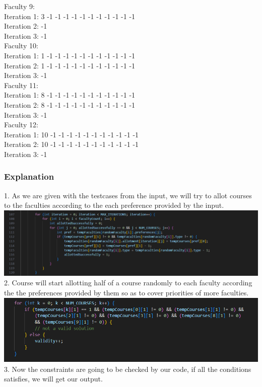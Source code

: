 \documentclass{article}
\begin{document}
Faculty 9: \\
Iteration 1: 3 -1 -1 -1 -1 -1 -1 -1 -1 -1 -1 -1\\ 
Iteration 2: -1\\
Iteration 3: -1\\
Faculty 10: \\
Iteration 1: 1 -1 -1 -1 -1 -1 -1 -1 -1 -1 -1 -1 \\
Iteration 2: 1 -1 -1 -1 -1 -1 -1 -1 -1 -1 -1 -1 \\
Iteration 3: -1\\
Faculty 11: \\
Iteration 1: 8 -1 -1 -1 -1 -1 -1 -1 -1 -1 -1 -1 \\
Iteration 2: 8 -1 -1 -1 -1 -1 -1 -1 -1 -1 -1 -1 \\
Iteration 3: -1\\
Faculty 12: \\
Iteration 1: 10 -1 -1 -1 -1 -1 -1 -1 -1 -1 -1 -1 \\
Iteration 2: 10 -1 -1 -1 -1 -1 -1 -1 -1 -1 -1 -1\\ 
Iteration 3: -1\\
\subsubsection{Explanation}
1. As we are given with the testcases from the input, we will try to allot courses to the faculties according to the each preference provided by the input.\\
\includegraphics[scale=0.48]{images/allotment.png}\\
2. Course will start allotting half of a course randomly to each faculty according the the preferences provided by them so as to cover priorities of more faculties.\\
\includegraphics[scale=0.5]{images/constraints.png}\\
3. Now the constraints are going to be checked by our code, if all the conditions satisfies, we will get our output.
\end{document}
